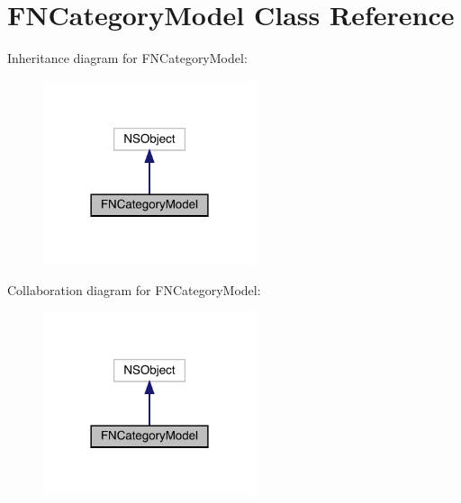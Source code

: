 \hypertarget{interface_f_n_category_model}{}\section{F\+N\+Category\+Model Class Reference}
\label{interface_f_n_category_model}


Inheritance diagram for F\+N\+Category\+Model\+:\nopagebreak
\begin{figure}[H]
\begin{center}
\leavevmode
\includegraphics[width=177pt]{interface_f_n_category_model__inherit__graph}
\end{center}
\end{figure}


Collaboration diagram for F\+N\+Category\+Model\+:\nopagebreak
\begin{figure}[H]
\begin{center}
\leavevmode
\includegraphics[width=177pt]{interface_f_n_category_model__coll__graph}
\end{center}
\end{figure}
